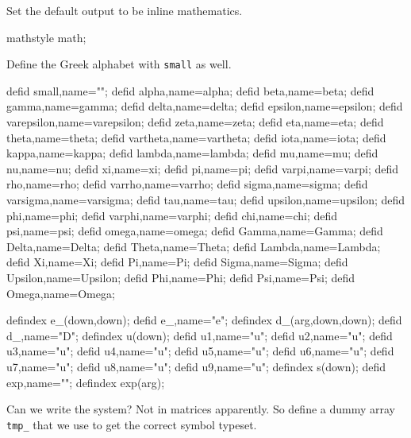 \documentclass[11pt,a5paper]{article}
\def\eps{\varepsilon}
\begin{document}
Set the default output to be inline mathematics.
\begin{reduce}
mathstyle math;
\end{reduce}

Define the Greek alphabet with \verb|small| as well.
\begin{reduce}
defid small,name="\eps";%
defid alpha,name=alpha;
defid beta,name=beta;
defid gamma,name=gamma;
defid delta,name=delta;
defid epsilon,name=epsilon;
defid varepsilon,name=varepsilon;
defid zeta,name=zeta;
defid eta,name=eta;
defid theta,name=theta;
defid vartheta,name=vartheta;
defid iota,name=iota;
defid kappa,name=kappa;
defid lambda,name=lambda;
defid mu,name=mu;
defid nu,name=nu;
defid xi,name=xi;
defid pi,name=pi;
defid varpi,name=varpi;
defid rho,name=rho;
defid varrho,name=varrho;
defid sigma,name=sigma;
defid varsigma,name=varsigma;
defid tau,name=tau;
defid upsilon,name=upsilon;
defid phi,name=phi;
defid varphi,name=varphi;
defid chi,name=chi;
defid psi,name=psi;
defid omega,name=omega;
defid Gamma,name=Gamma;
defid Delta,name=Delta;
defid Theta,name=Theta;
defid Lambda,name=Lambda;
defid Xi,name=Xi;
defid Pi,name=Pi;
defid Sigma,name=Sigma;
defid Upsilon,name=Upsilon;
defid Phi,name=Phi;
defid Psi,name=Psi;
defid Omega,name=Omega;
\end{reduce}


\begin{reduce}
defindex e_(down,down);
defid e_,name="e";
defindex d_(arg,down,down);
defid d_,name="D";
defindex u(down);
defid u1,name="u"; 
defid u2,name="u"; 
defid u3,name="u"; 
defid u4,name="u"; 
defid u5,name="u"; 
defid u6,name="u"; 
defid u7,name="u"; 
defid u8,name="u"; 
defid u9,name="u"; 
defindex s(down);
defid exp,name="\exp";
defindex exp(arg);
\end{reduce}


Can we write the system? Not in matrices apparently. So
define a dummy array \verb|tmp_| that we use to get the
correct symbol typeset.
\end{document}
